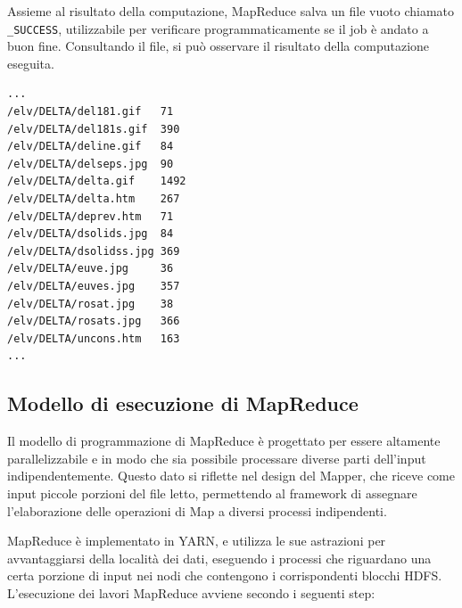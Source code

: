 \documentclass[italian,a4paper, twoside, 12pt]{report}
\begin{document}
Assieme al risultato della computazione, MapReduce salva un file vuoto
chiamato \lstinline!_SUCCESS!, utilizzabile per verificare
programmaticamente se il job è andato a buon fine. Consultando il file,
si può osservare il risultato della computazione eseguita.

\begin{lstlisting}[language=sh]
...
/elv/DELTA/del181.gif   71
/elv/DELTA/del181s.gif  390
/elv/DELTA/deline.gif   84
/elv/DELTA/delseps.jpg  90
/elv/DELTA/delta.gif    1492
/elv/DELTA/delta.htm    267
/elv/DELTA/deprev.htm   71
/elv/DELTA/dsolids.jpg  84
/elv/DELTA/dsolidss.jpg 369
/elv/DELTA/euve.jpg     36
/elv/DELTA/euves.jpg    357
/elv/DELTA/rosat.jpg    38
/elv/DELTA/rosats.jpg   366
/elv/DELTA/uncons.htm   163
...
\end{lstlisting}

\clearpage

\subsection{Modello di esecuzione di
MapReduce}\label{modello-di-esecuzione-di-mapreduce}

Il modello di programmazione di MapReduce è progettato per essere
altamente parallelizzabile e in modo che sia possibile processare
diverse parti dell'input indipendentemente. Questo dato si riflette nel
design del Mapper, che riceve come input piccole porzioni del file
letto, permettendo al framework di assegnare l'elaborazione delle
operazioni di Map a diversi processi indipendenti.

MapReduce è implementato in YARN, e utilizza le sue astrazioni per
avvantaggiarsi della località dei dati, eseguendo i processi che
riguardano una certa porzione di input nei nodi che contengono i
corrispondenti blocchi HDFS. L'esecuzione dei lavori MapReduce avviene
secondo i seguenti step:
\end{document}
